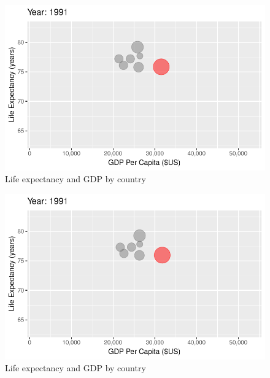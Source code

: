 \documentclass[
  letterpaper,
  DIV=11,
  numbers=noendperiod]{scrreport}
\theoremstyle{definition}
\theoremstyle{remark}
\begin{document}
\begin{figure}

{\centering \includegraphics{index_files/figure-pdf/fig-anim-country-71.pdf}

}

\caption{\label{fig-anim-country-71}Life expectancy and GDP by country}

\end{figure}

\begin{figure}

{\centering \includegraphics{index_files/figure-pdf/fig-anim-country-72.pdf}

}

\caption{\label{fig-anim-country-72}Life expectancy and GDP by country}

\end{figure}
\end{document}
